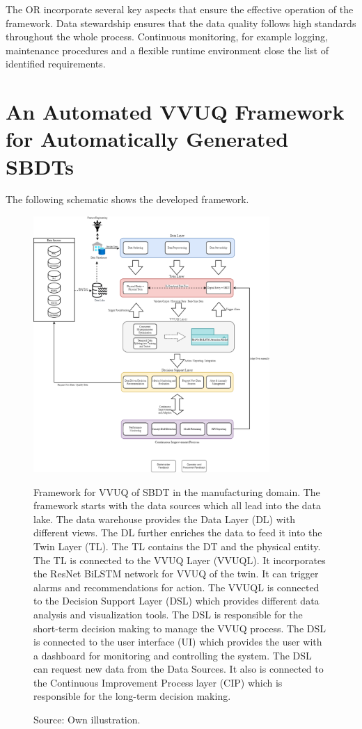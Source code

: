 The OR incorporate several key aspects that ensure the effective operation of the framework. Data stewardship ensures that the data quality follows high standards throughout the whole process. Continuous monitoring, for example logging, maintenance procedures and a flexible runtime environment close the list of identified requirements.

\section{An Automated VVUQ Framework for Automatically Generated SBDTs}
\label{sec:framework}

The following schematic shows the developed framework.
\begin{figure}[htbp]
  \centering
  \includegraphics[width=0.8\textwidth]{figures/framework.png}
  \caption{Framework for VVUQ of SBDT in the manufacturing domain. The framework starts with the data sources which all lead into the data lake. The data warehouse provides the Data Layer (DL) with different views. The DL further enriches the data to feed it into the Twin Layer (TL). The TL contains the DT and the physical entity. The TL is connected to the VVUQ Layer (VVUQL). It incorporates the ResNet BiLSTM network for VVUQ of the twin. It can trigger alarms and recommendations for action. The VVUQL is connected to the Decision Support Layer (DSL) which provides different data analysis and visualization tools. The DSL is responsible for the short-term decision making to manage the VVUQ process. The DSL is connected to the user interface (UI) which provides the user with a dashboard for monitoring and controlling the system. The DSL can request new data from the Data Sources. It also is connected to the Continuous Improvement Process layer (CIP) which is responsible for the long-term decision making.}
  \caption*{Source: Own illustration.}
  \label{fig:framework}
\end{figure}

